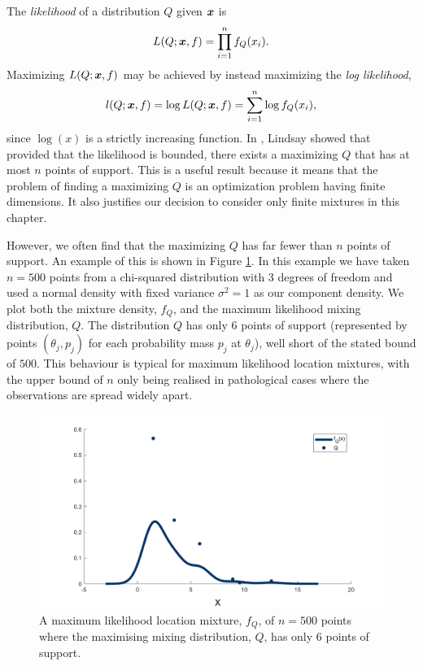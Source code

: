 	The \emph{likelihood} of a distribution $Q$ given ${\bm{{x}}}$ is 
	\begin{equation}
		L(Q;{\bm{{x}}}, f) = \prod_{i = 1}^n f_Q(x_i).
	\end{equation}
	Maximizing $L(Q;{\bm{{x}}}, f)$ may be achieved by instead maximizing the \emph{log likelihood},
	\begin{equation}
		l(Q; {\bm{{x}}}, f) = \log L(Q; {\bm{{x}}}, f) = \sum_{i = 1}^n \log f_Q(x_i),
		\label{eq:loglikelihood}
	\end{equation}
	since $\log(x)$ is a strictly increasing function. In \cite{Lindsay1983-tf}, Lindsay showed that provided that the likelihood is bounded, there exists a maximizing $Q$ that has at most $n$ points of support. This is a useful result because it means that the problem of finding a maximizing $Q$ is an optimization problem having finite dimensions. It also justifies our decision to consider only finite mixtures in this chapter.

	However, we often find that the maximizing $Q$ has far fewer than $n$ points of support. An example of this is shown in Figure \ref{fig:chi2 n500 motivation}. In this example we have taken $n = 500$ points from a chi-squared distribution with 3 degrees of freedom and used a normal density with fixed variance $\sigma^2 = 1$ as our component density. We plot both the mixture density, $f_Q$, and the maximum likelihood mixing distribution, $Q$. The distribution $Q$ has only 6 points of support (represented by points $(\theta_j, p_j)$ for each probability mass $p_j$ at $\theta_j$), well short of the stated bound of $500$. This behaviour is typical for maximum likelihood location mixtures, with the upper bound of $n$ only being realised in pathological cases where the observations are spread widely apart.

	\begin{figure}
		\centering
		\includegraphics[width = \textwidth]{Figures/Mixtures/chi2_n500_motivation.png}
		\caption{A maximum likelihood location mixture, $f_Q$, of $n = 500$ points where the maximising mixing distribution, $Q$, has only 6 points of support.}
		\label{fig:chi2 n500 motivation}
	\end{figure}

